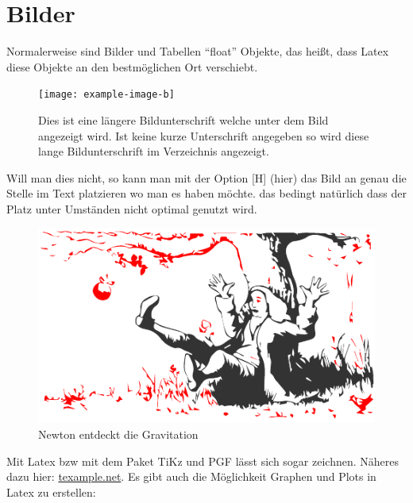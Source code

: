 \section{Bilder}
\label{sec:bilder}
Normalerweise sind Bilder und Tabellen "`float"' Objekte, das heißt, dass Latex diese Objekte an den bestmöglichen Ort verschiebt. 
\begin{figure}[H]
	\centering
	\texttt{[image: example-image-b]} 
	\caption[Dies ist eine kürzere Bildunterschrift (Verzeichnis)]{Dies ist eine längere Bildunterschrift welche unter dem Bild angezeigt wird. Ist keine kurze Unterschrift angegeben so wird diese lange Bildunterschrift im Verzeichnis angezeigt.}
	\label{fig:testbild}
\end{figure}
Will man dies nicht, so kann man mit der Option [H] (hier) das Bild an genau die Stelle im Text platzieren wo man es haben möchte. das bedingt natürlich dass der Platz unter Umständen nicht optimal genutzt wird.
\begin{figure}[H]
	\centering
	\includegraphics[width=0.7\linewidth]{bilder/newton}
	\caption{Newton entdeckt die Gravitation}
	\label{fig:newton}
\end{figure}

Mit Latex bzw mit dem Paket TiKz und PGF lässt sich sogar zeichnen. Näheres dazu hier: \href{http://www.texample.net/tikz/examples/}{texample.net}. Es gibt auch die Möglichkeit Graphen und Plots in Latex zu erstellen:



\clearpage